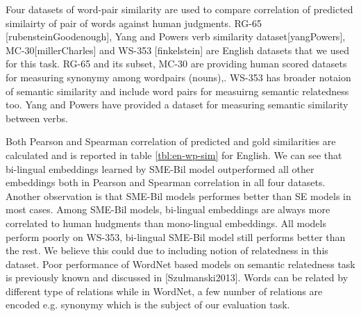  Four datasets of word-pair similarity are used to compare correlation of
 predicted similairty of pair of words against human judgments.
 RG-65 [rubensteinGoodenough], Yang and Powers verb similarity
 dataset[yangPowers], MC-30[millerCharles] and WS-353 [finkelstein] are English
 datasets that we used for this task. RG-65 and its subset, MC-30 are providing
 human scored datasets for measuring synonymy among wordpairs (nouns),. WS-353
 has broader notaion of semantic similarity and include word pairs for measuirng semantic
 relatedness too. Yang and Powers have provided a dataset for measuring semantic
 similarity between verbs.
  
 
  
 Both Pearson and Spearman correlation of predicted and gold similarities 
 are calculated and is reported in table \ref{tbl:en-wp-sim} for English. We can
 see that bi-lingual embeddings learned by SME-Bil model outperformed all other
 embeddings both in Pearson and Spearman correlation in all four datasets.
 Another observation is that SME-Bil models performes better than SE
 models in most cases. Among SME-Bil models, bi-lingual embeddings are always
 more correlated to human hudgments than mono-lingual embeddings.
 All models perform poorly on WS-353, bi-lingual SME-Bil model still performs
 better than the rest. We believe this could due to including notion of
 relatedness in this dataset. Poor performance of WordNet based models on
 semantic relatedness task is previously known and discussed in
 \cite{??}[Szulmanski2013]. Words can be related by different type of relations
 while in WordNet, a few number of relations are encoded e.g. synonymy which is the
 subject of our evaluation task.
 

